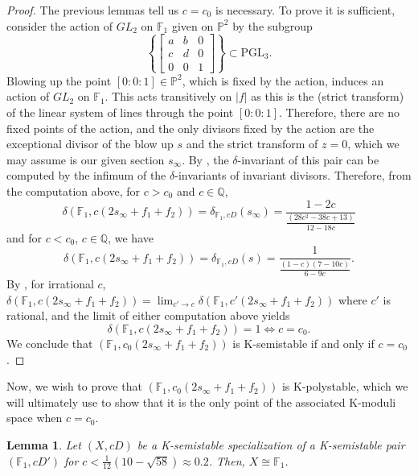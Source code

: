 \documentclass[11pt]{amsart}
\numberwithin{equation}{section}
\newtheorem{lemma}[theorem]{Lemma}
\theoremstyle{definition}
\newcommand{\bQ}{\mathbb{Q}}
\newcommand{\bF}{\mathbb{F}}
\newcommand{\PGL}{\mathrm{PGL}}
\newcommand{\bP}{\mathbb{P}}
\begin{document}
\begin{proof}
    The previous lemmas tell us $c = c_0$ is necessary.  To prove it is sufficient, consider the action of $GL_2$ on $\bF_1$ given on $\bP^2$ by the subgroup 
    \[ \left\{ \begin{bmatrix} a & b & 0 \\ c & d & 0 \\ 0 & 0 & 1 \end{bmatrix} \right\} \subset \PGL_3.  \]
    Blowing up the point $[0:0:1] \in \bP^2$, which is fixed by the action, induces an action of $GL_2$ on $\bF_1$.  This acts transitively on $|f|$ as this is the (strict transform) of the linear system of lines through the point $[0:0:1]$.  Therefore, there are no fixed points of the action, and the only divisors fixed by the action are the exceptional divisor of the blow up $s$ and the strict transform of $z = 0$, which we may assume is our given section $s_{\infty}$.  By \cite[Theorem 1.2]{Zhuang}, the $\delta$-invariant of this pair can be computed by the infimum of the $\delta$-invariants of invariant divisors.  Therefore, from the computation above, for $c > c_0$ and $c \in \bQ$, 
    \[ \delta(\bF_1, c(2s_\infty+f_1+f_2)) = \delta_{\bF_1, cD} (s_\infty) = \frac{1 - 2c} {\frac{(28c^2-38c+13)}{12-18c}} \] and for $c < c_0$, $c \in \bQ$, we have 
    \[ \delta(\bF_1, c(2s_\infty+f_1+f_2)) = \delta_{\bF_1, cD} (s) = \frac{1}{ \frac{(1-c)(7-10c)}{6-9c}} .\]
    By \cite{LZreal}, for irrational $c$, $\delta(\bF_1, c(2s_\infty+f_1+f_2)) = \lim_{c' \to c} \delta(\bF_1, c'(2s_\infty+f_1+f_2))$ where $c'$ is rational, and the limit of either computation above yields 
    \[ \delta(\bF_1, c(2s_\infty+f_1+f_2)) = 1 \iff c = c_0.\]
    We conclude that $(\bF_1,c_0(2s_\infty + f_1 + f_2)) $ is K-semistable if and only if $c = c_0$. 
\end{proof}

Now, we wish to prove that $(\bF_1, c_0(2s_\infty + f_1 + f_2))$ is K-polystable, which we will ultimately use to show that it is the only point of the associated K-moduli space when $c = c_0$.

\begin{lemma}\label{lem:F1}
    Let $(X,cD)$ be a K-semistable specialization of a K-semistable pair $(\bF_1, cD')$ for $c < \frac{1}{12}(10 - \sqrt{58}) \approx 0.2$.  Then, $X\cong \bF_1$.
\end{lemma}
\end{document}
